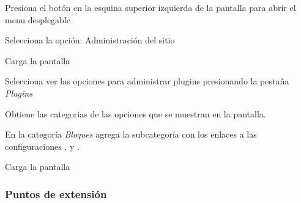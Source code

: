 \begin{UCtrayectoria}

    \Actor Presiona el botón \IUMenu en la esquina superior izquierda de la pantalla para abrir el
           menu desplegable

    \Actor Selecciona la opción: \IUAdminSitio Administración del sitio

    \Sistema Carga la pantalla 

    \Actor Selecciona ver las opciones para administrar plugins presionando la pestaña
           {\it Plugins}

    \Sistema Obtiene las categorias de las opciones que se muestran en la pantalla.

    \Sistema En la categoría {\it Bloques} agrega la subcategoría  con los
             enlaces a las configuraciones ,  y
             . 

    \Sistema Carga la pantalla 

\end{UCtrayectoria}


\subsubsection{Puntos de extensión}

